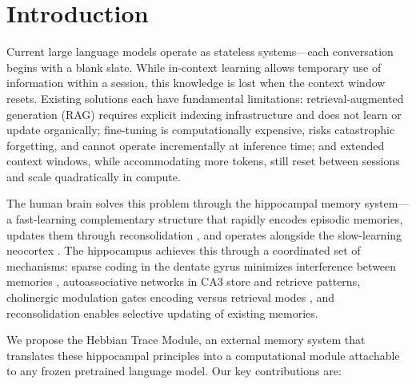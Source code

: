 \documentclass[11pt,a4paper]{article}
\begin{document}
\section{Introduction}

Current large language models \citep{vaswani2017attention,brown2020language} operate as stateless systems---each conversation begins with a blank slate. While in-context learning \citep{brown2020language} allows temporary use of information within a session, this knowledge is lost when the context window resets. Existing solutions each have fundamental limitations: retrieval-augmented generation (RAG) \citep{lewis2020retrieval} requires explicit indexing infrastructure and does not learn or update organically; fine-tuning is computationally expensive, risks catastrophic forgetting, and cannot operate incrementally at inference time; and extended context windows, while accommodating more tokens, still reset between sessions and scale quadratically in compute.

The human brain solves this problem through the hippocampal memory system---a fast-learning complementary structure that rapidly encodes episodic memories, updates them through reconsolidation \citep{nader2000fear}, and operates alongside the slow-learning neocortex \citep{mcclelland1995complementary}. The hippocampus achieves this through a coordinated set of mechanisms: sparse coding in the dentate gyrus minimizes interference between memories \citep{rolls2013mechanisms}, autoassociative networks in CA3 store and retrieve patterns, cholinergic modulation gates encoding versus retrieval modes \citep{hasselmo2006role}, and reconsolidation enables selective updating of existing memories.

We propose the Hebbian Trace Module, an external memory system that translates these hippocampal principles into a computational module attachable to any frozen pretrained language model. Our key contributions are:
\end{document}
